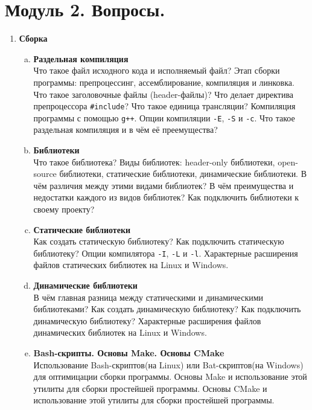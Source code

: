 \documentclass{article}
\begin{document}

\section*{Модуль 2. Вопросы.}
\begin{enumerate}

\item \textbf{Сборка}
\begin{enumerate}[a.]
\item \textbf{Раздельная компиляция}\\
Что такое файл исходного кода и исполняемый файл? Этап сборки программы: препроцессинг, ассемблирование, компиляция и линковка. Что такое заголовочные файлы (header-файлы)? Что делает директива препроцессора \texttt{\#include}? Что такое единица трансляции? Компиляция программы с помощью \texttt{g++}. Опции компиляции \texttt{-E}, \texttt{-S} и \texttt{-c}. Что такое раздельная компиляция и в чём её преемущества?


\item \textbf{Библиотеки}\\
Что такое библиотека? Виды библиотек: header-only библиотеки, open-source библиотеки, статические библиотеки, динамические библиотеки. В чём различия между этими видами библиотек? В чём преимущества и недостатки каждого из видов библиотек? Как подключить библиотеки к своему проекту? 

\item \textbf{Статические библиотеки}\\
Как создать статическую библиотеку? Как подключить статическую библиотеку? Опции компилятора \texttt{-I}, \texttt{-L} и \texttt{-l}. Характерные расширения файлов статических библиотек на Linux и Windows. 

\item \textbf{Динамические библиотеки}\\
В чём главная разница между статическими и динамическими библиотеками? Как создать динамическую библиотеку? Как подключить динамическую библиотеку? Характерные расширения файлов динамических библиотек на Linux и Windows. 

\item \textbf{Bash-скрипты. Основы Make. Основы CMake}\\
Использование Bash-скриптов(на Linux) или Bat-скриптов(на Windows) для оптимицации сборки программы. Основы Make и использование этой утилиты для сборки простейшей программы. Основы CMake и использование этой утилиты для сборки простейшей программы.
\end{enumerate}




\end{enumerate}
\end{document}
